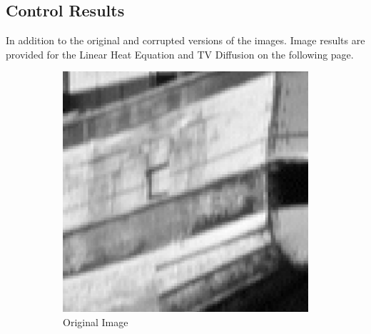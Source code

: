\documentclass{article}
\begin{document}
  \subsection{Control Results}
  In addition to the original and corrupted versions of the images.
  Image results are provided for the Linear Heat Equation and TV Diffusion
  on the following page.

  \begin{figure}[!htb]
    \begin{center}
      \begin{subfigure}[b]{0.4\textwidth}
        \includegraphics[width=\textwidth]{../report_images/boat_crop.png}
        \caption{Original Image}
      \end{subfigure}
      \hfill
      \begin{subfigure}[b]{0.4\textwidth}

\end{subfigure}
\end{center}
\end{figure}
\end{document}
